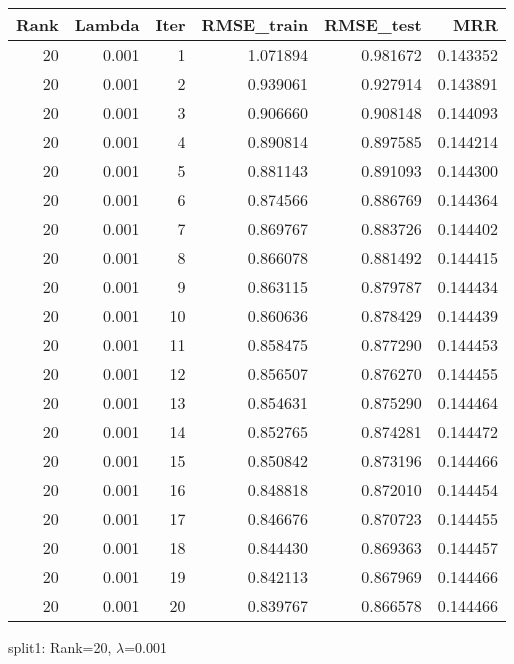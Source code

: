 \begin{tabular}{rrrrrr}
\toprule
 Rank &  Lambda &  Iter &  RMSE\_train &  RMSE\_test &       MRR \\
\midrule
   20 &   0.001 &     1 &    1.071894 &   0.981672 &  0.143352 \\
   20 &   0.001 &     2 &    0.939061 &   0.927914 &  0.143891 \\
   20 &   0.001 &     3 &    0.906660 &   0.908148 &  0.144093 \\
   20 &   0.001 &     4 &    0.890814 &   0.897585 &  0.144214 \\
   20 &   0.001 &     5 &    0.881143 &   0.891093 &  0.144300 \\
   20 &   0.001 &     6 &    0.874566 &   0.886769 &  0.144364 \\
   20 &   0.001 &     7 &    0.869767 &   0.883726 &  0.144402 \\
   20 &   0.001 &     8 &    0.866078 &   0.881492 &  0.144415 \\
   20 &   0.001 &     9 &    0.863115 &   0.879787 &  0.144434 \\
   20 &   0.001 &    10 &    0.860636 &   0.878429 &  0.144439 \\
   20 &   0.001 &    11 &    0.858475 &   0.877290 &  0.144453 \\
   20 &   0.001 &    12 &    0.856507 &   0.876270 &  0.144455 \\
   20 &   0.001 &    13 &    0.854631 &   0.875290 &  0.144464 \\
   20 &   0.001 &    14 &    0.852765 &   0.874281 &  0.144472 \\
   20 &   0.001 &    15 &    0.850842 &   0.873196 &  0.144466 \\
   20 &   0.001 &    16 &    0.848818 &   0.872010 &  0.144454 \\
   20 &   0.001 &    17 &    0.846676 &   0.870723 &  0.144455 \\
   20 &   0.001 &    18 &    0.844430 &   0.869363 &  0.144457 \\
   20 &   0.001 &    19 &    0.842113 &   0.867969 &  0.144466 \\
   20 &   0.001 &    20 &    0.839767 &   0.866578 &  0.144466 \\
\bottomrule
\end{tabular}

\caption{split1: Rank=20, $\lambda$=0.001}
